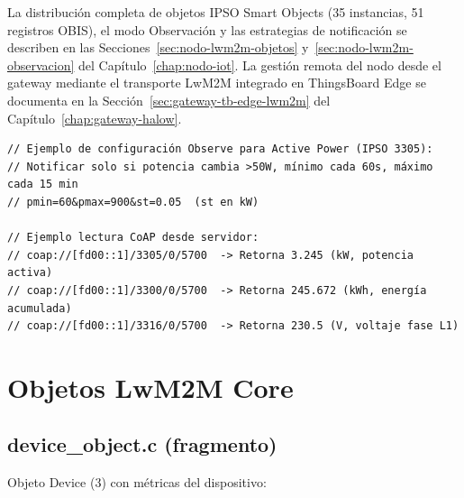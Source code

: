 La distribución completa de objetos IPSO Smart Objects (35 instancias, 51 registros OBIS), el modo Observación y las estrategias de notificación se describen en las Secciones~\ref{sec:nodo-lwm2m-objetos} y~\ref{sec:nodo-lwm2m-observacion} del Capítulo~\ref{chap:nodo-iot}. La gestión remota del nodo desde el gateway mediante el transporte LwM2M integrado en ThingsBoard Edge se documenta en la Sección~\ref{sec:gateway-tb-edge-lwm2m} del Capítulo~\ref{chap:gateway-halow}.

\begin{verbatim}
// Ejemplo de configuración Observe para Active Power (IPSO 3305):
// Notificar solo si potencia cambia >50W, mínimo cada 60s, máximo cada 15 min
// pmin=60&pmax=900&st=0.05  (st en kW)

// Ejemplo lectura CoAP desde servidor:
// coap://[fd00::1]/3305/0/5700  -> Retorna 3.245 (kW, potencia activa)
// coap://[fd00::1]/3300/0/5700  -> Retorna 245.672 (kWh, energía acumulada)
// coap://[fd00::1]/3316/0/5700  -> Retorna 230.5 (V, voltaje fase L1)
\end{verbatim}

\section{Objetos LwM2M Core}

\subsection{device\_object.c (fragmento)}

Objeto Device (3) con métricas del dispositivo:

